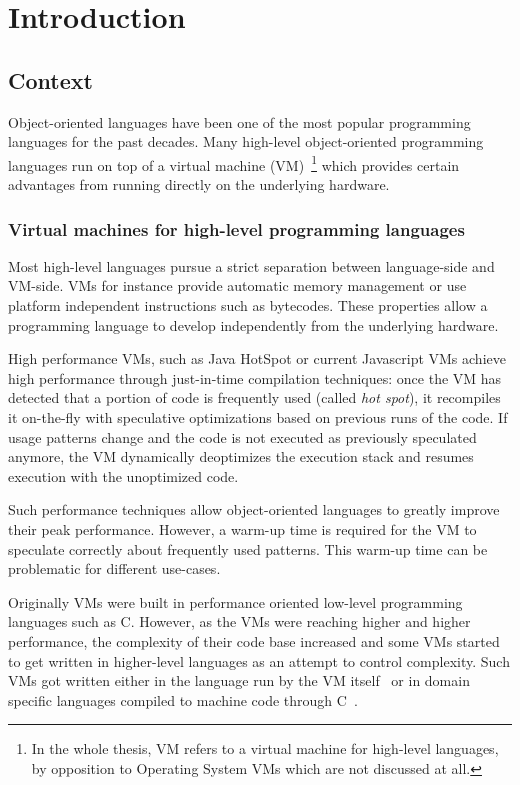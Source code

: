 \documentclass[a4paper,12pt,twoside]{../includes/ThesisStyle}
\begin{document}
\fi

\chapter{Introduction}
\label{chap:intro}
\minitoc

\section{Context}

Object-oriented languages have been one of the most popular programming languages for the past decades. Many high-level object-oriented programming languages run on top of a virtual machine (VM)~\footnote{In the whole thesis, VM refers to a virtual machine for high-level languages, by opposition to Operating System VMs which are not discussed at all.} which provides certain advantages from running directly on the underlying hardware. 

\subsection{Virtual machines for high-level programming languages}

Most high-level languages pursue a strict separation between language-side and VM-side. VMs for instance provide automatic memory management or use platform independent instructions such as bytecodes. These properties allow a programming language to develop independently from the underlying hardware.

High performance VMs, such as Java HotSpot or current Javascript VMs achieve high performance through just-in-time compilation techniques: once the VM has detected that a portion of code is frequently used (called \emph{hot spot}), it recompiles it on-the-fly with speculative optimizations based on previous runs of the code. If usage patterns change and the code is not executed as previously speculated anymore, the VM dynamically deoptimizes the execution stack and resumes execution with the unoptimized code.

Such performance techniques allow object-oriented languages to greatly improve their peak performance. However, a warm-up time is required for the VM to speculate correctly about frequently used patterns. This warm-up time can be problematic for different use-cases.

Originally VMs were built in performance oriented low-level programming languages such as C. However, as the VMs were reaching higher and higher performance, the complexity of their code base increased and some VMs started to get written in higher-level languages as an attempt to control complexity. Such VMs got written either in the language run by the VM itself~\cite{Unga05b,Wimm13a,Alp99a} or in domain specific languages compiled to machine code through C~\cite{Rigo06a,Inga97a}.
\end{document}
